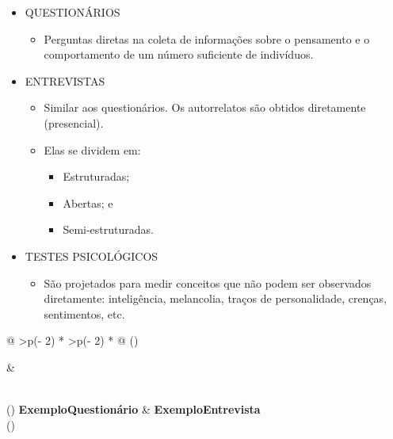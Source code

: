 \documentclass[
]{book}
\providecommand{\tightlist}{%
  \setlength{\itemsep}{0pt}\setlength{\parskip}{0pt}}
\begin{document}
\begin{itemize}
\tightlist
\item
  QUESTIONÁRIOS

  \begin{itemize}
  \tightlist
  \item
    Perguntas diretas na coleta de informações sobre o pensamento e o comportamento de um número suficiente de indivíduos.
  \end{itemize}
\item
  ENTREVISTAS

  \begin{itemize}
  \tightlist
  \item
    Similar aos questionários. Os autorrelatos são obtidos diretamente (presencial).
  \item
    Elas se dividem em:

    \begin{itemize}
    \tightlist
    \item
      Estruturadas;
    \item
      Abertas; e
    \item
      Semi-estruturadas.
    \end{itemize}
  \end{itemize}
\item
  TESTES PSICOLÓGICOS

  \begin{itemize}
  \tightlist
  \item
    São projetados para medir conceitos que não podem ser observados diretamente: inteligência, melancolia, traços de personalidade, crenças, sentimentos, etc.
  \end{itemize}
\end{itemize}

\begin{longtable}[]{@{}
  >{\centering\arraybackslash}p{(\columnwidth - 2\tabcolsep) * }
  >{\centering\arraybackslash}p{(\columnwidth - 2\tabcolsep) * }@{}}
\toprule()
\begin{minipage}[b]{\linewidth}\centering
\end{minipage} & \begin{minipage}[b]{\linewidth}\centering
\end{minipage} \\
\midrule()
\endhead
\textbf{ExemploQuestionário} & \textbf{ExemploEntrevista} \\
\bottomrule()
\end{longtable}
\end{document}
